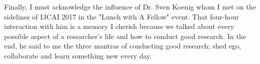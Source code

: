 Finally, I must acknowledge the influence of Dr. Sven Koenig whom I met on the sidelines of IJCAI 2017 in the "Lunch with  A Fellow" event. That four-hour interaction with him is a memory I cherish because we talked about every possible aspect of a researcher's life and how to conduct good research. In the end, he said to me the three mantras of conducting good research; shed ego, collaborate and learn something new every day.

